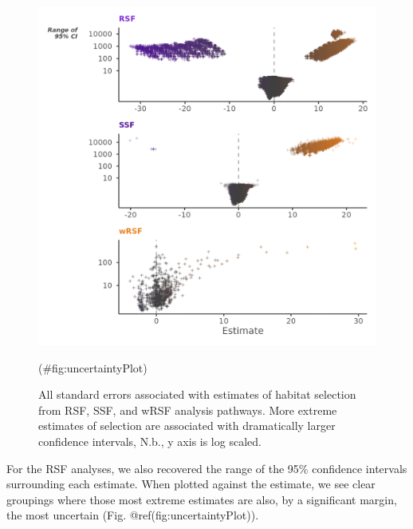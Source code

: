 \documentclass[10pt,a4paper]{article}
\begin{document}
\begin{figure}
\includegraphics[width=1\linewidth]{../figures/uncertaintyPlot} \caption{All standard errors associated with estimates of habitat selection from RSF, SSF, and wRSF analysis pathways. More extreme estimates of selection are associated with dramatically larger confidence intervals, N.b., y axis is log scaled.}(\#fig:uncertaintyPlot)
\end{figure}

For the RSF analyses, we also recovered the range of the 95\% confidence intervals surrounding each estimate.
When plotted against the estimate, we see clear groupings where those most extreme estimates are also, by a significant margin, the most uncertain (Fig. @ref(fig:uncertaintyPlot)).
\end{document}
